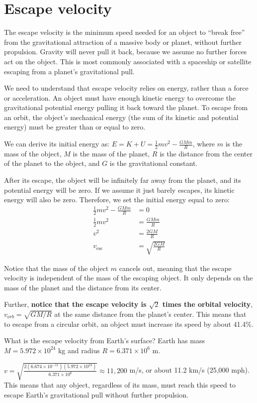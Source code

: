\section{Escape velocity}
The escape velocity is the minimum speed needed for an object to ``break free'' from the gravitational attraction of a massive body or planet, without further propulsion. Gravity will never pull it back, because we assume no further forces act on the object. This is most commonly associated with a spaceship or satellite escaping from a planet's gravitational pull.

We need to understand that escape velocity relies on energy, rather than a force or acceleration. An object must have enough kinetic energy to overcome the gravitational potential energy pulling it back toward the planet.
To escape from an orbit, the object's mechanical energy (the sum of its kinetic and potential energy) must be greater than or equal to zero.

We can derive its initial energy as: $E = K + U = \frac{1}{2}mv^2 - \frac{GMm}{R}$, where $m$ is the mass of the object, $M$ is the mass of the planet, $R$ is the distance from the center of the planet to the object, and $G$ is the gravitational constant.

After its escape, the object will be infinitely far away from the planet, and its potential energy will be zero. If we assume it just barely escapes, its kinetic energy will also be zero. Therefore, we set the initial energy equal to zero:
\begin{align}
  \frac{1}{2}mv^2 - \frac{GMm}{R} &= 0 \\
  \frac{1}{2}mv^2 &= \frac{GMm}{R} \\
  v^2 &= \frac{2GM}{R} \\
  v_{\text{esc}} &= \sqrt{\frac{2GM}{R}} \label{eq:escveleq}
\end{align}

Notice that the mass of the object $m$ cancels out, meaning that the escape velocity is independent of the mass of the escaping object. It only depends on the mass of the planet and the distance from its center.

Further, \textbf{notice that the escape velocity is $\sqrt{2}$ times the orbital velocity}, $v_{orb} = \sqrt{GM/R}$ at the same distance from the planet's center. This means that to escape from a circular orbit, an object must increase its speed by about 41.4\%.

\begin{Worked}
\begin{Problem}
What is the escape velocity from Earth's surface?
Earth has mass $M = 5.972 \times 10^{24}$ kg and radius
$R = 6.371 \times 10^6$ m.
\end{Problem}
\begin{Solution}
$v = \sqrt{\frac{2(6.674 \times 10^{-11})(5.972 \times 10^{24})}{6.371 \times 10^6}} \approx 11{,}200$ m/s,
or about 11.2 km/s (25,000 mph). This means that any object, regardless of its mass, must reach this speed to escape Earth's gravitational pull without further propulsion.
\end{Solution}
\end{Worked}

